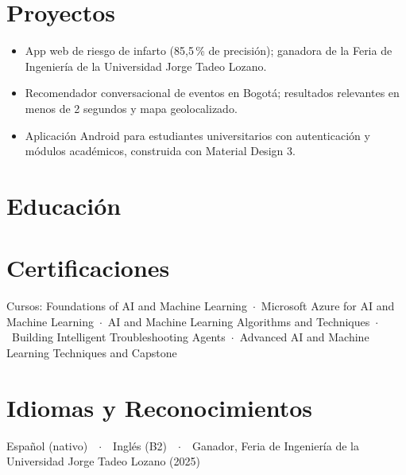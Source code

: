 \section{Proyectos}
\begin{itemize}
  \item App web de riesgo de infarto (85,5\,\% de precisión); ganadora de la Feria de Ingeniería de la Universidad Jorge Tadeo Lozano.
\end{itemize}
\begin{itemize}
  \item Recomendador conversacional de eventos en Bogotá; resultados relevantes en menos de 2 segundos y mapa geolocalizado.
\end{itemize}
\begin{itemize}
  \item Aplicación Android para estudiantes universitarios con autenticación y módulos académicos, construida con Material Design 3.
\end{itemize}

\section{Educación}

\section{Certificaciones}
{\small Cursos: Foundations of AI and Machine Learning\ $\cdot$\ Microsoft Azure for AI and Machine Learning\ $\cdot$\ AI and Machine Learning Algorithms and Techniques\ $\cdot$\ Building Intelligent Troubleshooting Agents\ $\cdot$\ Advanced AI and Machine Learning Techniques and Capstone\par}

\section{Idiomas y Reconocimientos}
Español (nativo)\ \ $\cdot$\ \ Inglés (B2)\ \ $\cdot$\ \ Ganador, Feria de Ingeniería de la Universidad Jorge Tadeo Lozano (2025)


